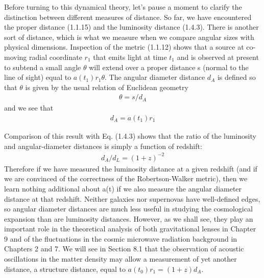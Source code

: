 \documentclass[11pt,a4paper,dvipdfmx]{jsarticle}
\theoremstyle{plain}
\theoremstyle{break}
\begin{document}
Before turning to this dynamical theory, let’s pause a moment to clarify the distinction between different measures of distance.
So far, we have encountered the proper distance (1.1.15) and the luminosity distance (1.4.3).
There is another sort of distance, which is what we measure when we compare angular sizes with physical dimensions.
Inspection of the metric (1.1.12) shows that a source at co-moving radial coordinate $r_1$ that emits light at time $t_1$ and is observed at present to subtend a small angle $\theta$ will extend over a proper distance s (normal to the line of sight) equal to $a(t_1)r_1\theta$. The angular diameter distance $d_A$ is defined so that $\theta$ is given by the usual relation of Euclidean geometry
\begin{align}
  \theta = s/d_A
\end{align}
and we see that
\begin{align}
  d_A = a(t_1) r_1
\end{align}

Comparison of this result with Eq. (1.4.3) shows that the ratio of the luminosity and angular-diameter distances is simply a function of redshift:
\begin{align}
  d_{A} / d_{L}=(1+z)^{-2}
\end{align}
Therefore if we have measured the luminosity distance at a given redshift (and if we are convinced of the correctness of the Robertson-Walker metric), then we learn nothing additional about a(t) if we also measure the angular diameter distance at that redshift.
Neither galaxies nor supernovas have well-defined edges, so angular diameter distances are much less useful in studying the cosmological expansion than are luminosity distances. However, as we shall see, they play an important role in the theoretical analysis of both gravitational lenses in Chapter 9 and of the fluctuations in the cosmic microwave radiation background in Chapters 2 and 7.
We will see in Section 8.1 that the observation of acoustic oscillations in the matter density may allow a measurement of yet another distance, a structure distance, equal to $a(t_0)r_1 = (1 + z)d_A$.

\fi

\newpage
\setcounter{section}{4}
\end{document}
